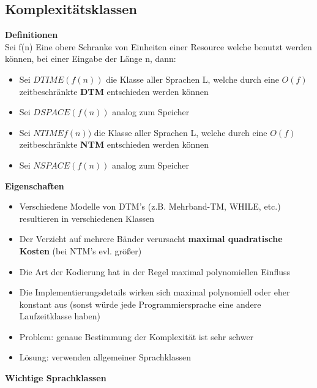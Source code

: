 \documentclass[12pt,a4paper]{article}
\begin{document}
\subsection{Komplexitätsklassen}
\textbf{Definitionen}\\
Sei f(n) Eine obere Schranke von Einheiten einer Resource welche benutzt werden können, bei einer Eingabe der Länge n, dann:\\
\begin{itemize}
\item Sei $DTIME(f(n))$ die Klasse aller Sprachen L, welche durch eine $O(f)$ zeitbeschränkte \textbf{DTM} entschieden werden können
\item Sei $DSPACE(f(n))$ analog zum Speicher
\item Sei $NTIMEf(n))$ die Klasse aller Sprachen L, welche durch eine $O(f)$ zeitbeschränkte \textbf{NTM} entschieden werden können
\item Sei $NSPACE(f(n))$ analog zum Speicher
\end{itemize}
\textbf{Eigenschaften}
\begin{itemize}
\item Verschiedene Modelle von DTM's (z.B. Mehrband-TM, WHILE, etc.) resultieren in verschiedenen Klassen
\item Der Verzicht auf mehrere Bänder verursacht \textbf{maximal quadratische Kosten} (bei NTM's evl. größer)
\item Die Art der Kodierung hat in der Regel maximal polynomiellen Einfluss
\item Die Implementierungsdetails wirken sich maximal polynomiell oder eher konstant aus (sonst würde jede Programmiersprache eine andere Laufzeitklasse haben)
\item Problem: genaue Bestimmung der Komplexität ist sehr schwer
\item Lösung: verwenden allgemeiner Sprachklassen
\end{itemize}
\textbf{Wichtige Sprachklassen}\\
\end{document}
